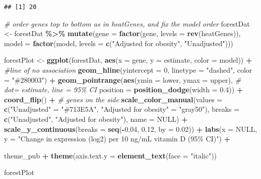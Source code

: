 \documentclass[
]{article}
\newenvironment{Shaded}{\begin{snugshade}}{\end{snugshade}}
\newcommand{\AttributeTok}[1]{\textcolor[rgb]{0.13,0.29,0.53}{#1}}
\newcommand{\CommentTok}[1]{\textcolor[rgb]{0.56,0.35,0.01}{\textit{#1}}}
\newcommand{\ConstantTok}[1]{\textcolor[rgb]{0.56,0.35,0.01}{#1}}
\newcommand{\DecValTok}[1]{\textcolor[rgb]{0.00,0.00,0.81}{#1}}
\newcommand{\FloatTok}[1]{\textcolor[rgb]{0.00,0.00,0.81}{#1}}
\newcommand{\FunctionTok}[1]{\textcolor[rgb]{0.13,0.29,0.53}{\textbf{#1}}}
\newcommand{\NormalTok}[1]{#1}
\newcommand{\OtherTok}[1]{\textcolor[rgb]{0.56,0.35,0.01}{#1}}
\newcommand{\SpecialCharTok}[1]{\textcolor[rgb]{0.81,0.36,0.00}{\textbf{#1}}}
\newcommand{\StringTok}[1]{\textcolor[rgb]{0.31,0.60,0.02}{#1}}
\begin{document}
\begin{verbatim}
## [1] 20
\end{verbatim}

\begin{Shaded}
\begin{Highlighting}[]
\CommentTok{\# order genes top to bottom as in heatGenes, and fix the model order}
\NormalTok{forestDat }\OtherTok{\textless{}{-}}\NormalTok{ forestDat }\SpecialCharTok{\%\textgreater{}\%}
  \FunctionTok{mutate}\NormalTok{(}\AttributeTok{gene  =} \FunctionTok{factor}\NormalTok{(gene, }\AttributeTok{levels =} \FunctionTok{rev}\NormalTok{(heatGenes)),}
         \AttributeTok{model =} \FunctionTok{factor}\NormalTok{(model, }\AttributeTok{levels =} \FunctionTok{c}\NormalTok{(}\StringTok{"Adjusted for obesity"}\NormalTok{, }\StringTok{"Unadjusted"}\NormalTok{)))}

\NormalTok{forestPlot }\OtherTok{\textless{}{-}} \FunctionTok{ggplot}\NormalTok{(forestDat, }\FunctionTok{aes}\NormalTok{(}\AttributeTok{x =}\NormalTok{ gene, }\AttributeTok{y =}\NormalTok{ estimate, }\AttributeTok{color =}\NormalTok{ model)) }\SpecialCharTok{+}
  \CommentTok{\#line of no association}
  \FunctionTok{geom\_hline}\NormalTok{(}\AttributeTok{yintercept =} \DecValTok{0}\NormalTok{, }\AttributeTok{linetype =} \StringTok{"dashed"}\NormalTok{, }\AttributeTok{color =} \StringTok{"\#280003"}\NormalTok{) }\SpecialCharTok{+}
  \FunctionTok{geom\_pointrange}\NormalTok{(}\FunctionTok{aes}\NormalTok{(}\AttributeTok{ymin =}\NormalTok{ lower, }\AttributeTok{ymax =}\NormalTok{ upper),}
                  \CommentTok{\# dot= estimate, line = 95\% CI}
                  \AttributeTok{position =} \FunctionTok{position\_dodge}\NormalTok{(}\AttributeTok{width =} \FloatTok{0.4}\NormalTok{)) }\SpecialCharTok{+}  
  \FunctionTok{coord\_flip}\NormalTok{() }\SpecialCharTok{+}      \CommentTok{\# genes on the side}
  \FunctionTok{scale\_color\_manual}\NormalTok{(}\AttributeTok{values =} \FunctionTok{c}\NormalTok{(}\StringTok{"Unadjusted"} \OtherTok{=} \StringTok{"\#713E5A"}\NormalTok{,}
                                \StringTok{"Adjusted for obesity"} \OtherTok{=} \StringTok{"gray50"}\NormalTok{),}
                     \AttributeTok{breaks =} \FunctionTok{c}\NormalTok{(}\StringTok{"Unadjusted"}\NormalTok{, }\StringTok{"Adjusted for obesity"}\NormalTok{),}
                     \AttributeTok{name =} \ConstantTok{NULL}\NormalTok{) }\SpecialCharTok{+}
  \FunctionTok{scale\_y\_continuous}\NormalTok{(}\AttributeTok{breaks =} \FunctionTok{seq}\NormalTok{(}\SpecialCharTok{{-}}\FloatTok{0.04}\NormalTok{, }\FloatTok{0.12}\NormalTok{, }\AttributeTok{by =} \FloatTok{0.02}\NormalTok{)) }\SpecialCharTok{+}
  \FunctionTok{labs}\NormalTok{(}\AttributeTok{x =} \ConstantTok{NULL}\NormalTok{,}
       \AttributeTok{y =} \StringTok{"Change in expression (log2) per 10 ng/mL vitamin D (95\% CI)"}\NormalTok{) }\SpecialCharTok{+}
  
\NormalTok{  theme\_pub }\SpecialCharTok{+}
  \FunctionTok{theme}\NormalTok{(}\AttributeTok{axis.text.y =} \FunctionTok{element\_text}\NormalTok{(}\AttributeTok{face =} \StringTok{"italic"}\NormalTok{))}

\NormalTok{forestPlot}
\end{Highlighting}
\end{Shaded}
\end{document}
